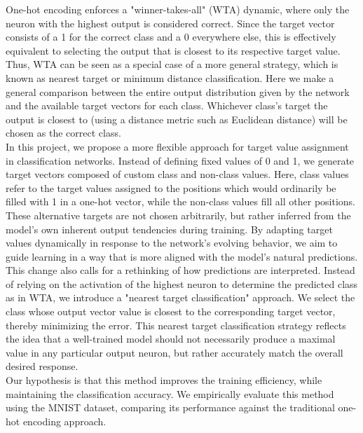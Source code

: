 \documentclass[12pt,fleqn,a4paper]{article}
\begin{document}
One-hot encoding enforces a "winner-takes-all" (WTA) dynamic, where only the neuron with the highest output is considered correct. Since the target vector consists of a 1 for the correct class and a 0 everywhere else, this is effectively equivalent to selecting the output that is closest to its respective target value. Thus, WTA can be seen as a special case of a more general strategy, which is known as nearest target or minimum distance classification. Here we make a general comparison between the entire output distribution given by the network and the available target vectors for each class. Whichever class's target the output is closest to (using a distance metric such as Euclidean distance) will be chosen as the correct class. \\

In this project, we propose a more flexible approach for target value assignment in classification networks. Instead of defining fixed values of 0 and 1, we generate target vectors composed of custom class and non-class values. Here, class values refer to the target values assigned to the positions which would ordinarily be filled with 1 in a one-hot vector, while the non-class values fill all other positions. These alternative targets are not chosen arbitrarily, but rather inferred from the model's own inherent output tendencies during training. By adapting target values dynamically in response to the network's evolving behavior, we aim to guide learning in a way that is more aligned with the model's natural predictions. \\

This change also calls for a rethinking of how predictions are interpreted. Instead of relying on the activation of the highest neuron to determine the predicted class as in WTA, we introduce a "nearest target classification" approach. We select the class whose output vector value is closest to the corresponding target vector, thereby minimizing the error. This nearest target classification strategy reflects the idea that a well-trained model should not necessarily produce a maximal value in any particular output neuron, but rather accurately match the overall desired response. \\

Our hypothesis is that this method improves the training efficiency, while maintaining the classification accuracy. We empirically evaluate this method using the MNIST dataset, comparing its performance against the traditional one-hot encoding approach. \\
\end{document}
